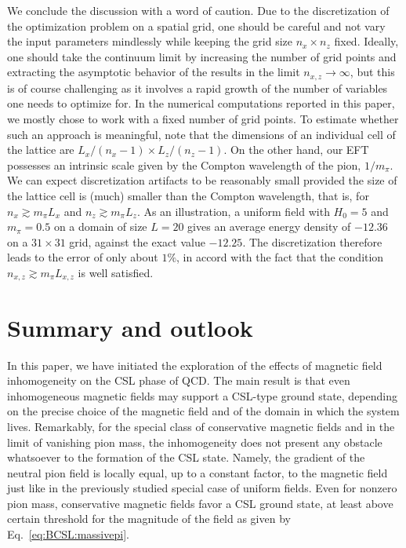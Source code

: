 \documentclass[pdflatex,iicol,sn-mathphys-num]{sn-jnl}
\begin{document}
We conclude the discussion with a word of caution. Due to the discretization of the optimization problem on a spatial grid, one should be careful and not vary the input parameters mindlessly while keeping the grid size $n_x\times n_z$ fixed. Ideally, one should take the continuum limit by increasing the number of grid points and extracting the asymptotic behavior of the results in the limit $n_{x,z}\to\infty$, but this is of course challenging as it involves a rapid growth of the number of variables one needs to optimize for. In the numerical computations reported in this paper, we mostly chose to work with a fixed number of grid points. To estimate whether such an approach is meaningful, note that the dimensions of an individual cell of the lattice are $L_x/(n_x-1)\times L_z/(n_z-1)$. On the other hand, our EFT possesses an intrinsic scale given by the Compton wavelength of the pion, $1/m_\pi$. We can expect discretization artifacts to be reasonably small provided the size of the lattice cell is (much) smaller than the Compton wavelength, that is, for $n_x\gtrsim m_\pi L_x$ and $n_z\gtrsim m_\pi L_z$. As an illustration, a uniform field with $H_{0} = 5$ and $m_{\pi} = 0.5$ on a domain of size $L = 20$ gives an average energy density of $-12.36$ on a $ 31 \times 31$ grid, against the exact value $-12.25$. The discretization therefore leads to the error of only about $1\%$, in accord with the fact that the condition $n_{x,z}\gtrsim m_\pi L_{x,z}$ is well satisfied.  


\section{Summary and outlook}
\label{sec:summary}

In this paper, we have initiated the exploration of the effects of magnetic field inhomogeneity on the CSL phase of QCD. The main result is that even inhomogeneous magnetic fields may support a CSL-type ground state, depending on the precise choice of the magnetic field and of the domain in which the system lives. Remarkably, for the special class of conservative magnetic fields and in the limit of vanishing pion mass, the inhomogeneity does not present any obstacle whatsoever to the formation of the CSL state. Namely, the gradient of the neutral pion field is locally equal, up to a constant factor, to the magnetic field just like in the previously studied special case of uniform fields. Even for nonzero pion mass, conservative magnetic fields favor a CSL ground state, at least above certain threshold for the magnitude of the field as given by Eq.~\eqref{eq:BCSL:massivepi}.
\end{document}
